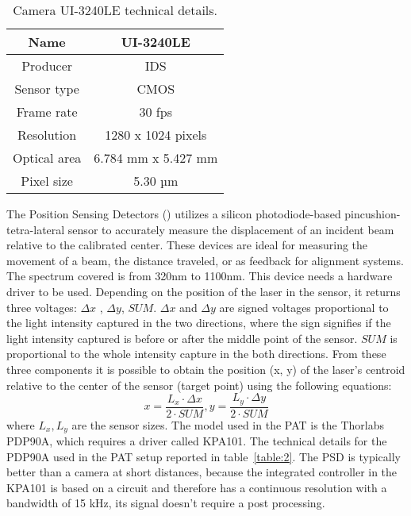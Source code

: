 \begin{table}[h!]
      \centering
      \begin{tabular}{ |c|c| }
            \hline
            Name         & UI-3240LE           \\\hline
            Producer     & IDS                 \\\hline
            Sensor type  & CMOS                \\\hline
            Frame rate   & 30 fps              \\\hline
            Resolution   & 1280 x 1024 pixels  \\\hline
            Optical area & 6.784 mm x 5.427 mm \\\hline
            Pixel size   & 5.30 µm             \\\hline
      \end{tabular}
      \caption{Camera UI-3240LE technical details.}
      \label{table:1}
\end{table}

The Position Sensing Detectors () utilizes a silicon photodiode-based pincushion-tetra-lateral sensor to accurately measure the displacement of an incident beam relative to the calibrated center. These devices are ideal for measuring the movement of a beam, the distance traveled, or as feedback for alignment systems.
The spectrum covered is from 320nm to 1100nm. This device needs a hardware driver to be used. Depending on the position of the laser in the sensor, it returns three voltages: $\Delta x$ , $\Delta y$, $SUM$.
$\Delta x$ and $\Delta y$ are signed voltages proportional to the light intensity captured in the two directions, where the sign signifies if the light intensity captured is before or after the middle point of the sensor. $SUM$ is proportional to the whole intensity capture in the both directions.
From these three components it is possible to obtain the position (x, y) of the laser's centroid relative to the center of the sensor (target point) using the following equations:
\begin{equation}
      x = \frac{L_x \cdot \Delta x}{2 \cdot SUM}, y = \frac{L_y \cdot \Delta y}{2 \cdot  SUM}
      \label{eq:KPA101}
\end{equation}
where $L_x,L_y$ are the sensor sizes. The model used in the PAT is the Thorlabs PDP90A, which requires a driver called KPA101. The technical details for the PDP90A used in the PAT setup reported in table~\ref{table:2}.
The PSD is typically better than a camera at short distances, because the integrated controller in the KPA101 is based on a circuit and therefore has a continuous resolution with a bandwidth of 15 kHz, its signal doesn't require a post processing.

